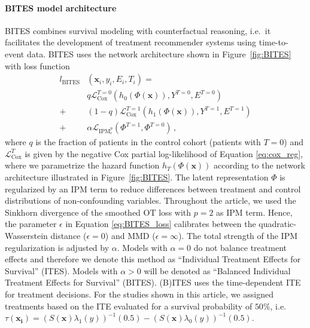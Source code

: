 \documentclass{article}
\newcommand{\myvec}[1]{\boldsymbol{#1}}
\begin{document}
	\paragraph{BITES model architecture} BITES combines survival modeling with counterfactual reasoning, i.e.~it facilitates the development of treatment recommender systems using time-to-event data. 
	BITES uses the network architecture shown in Figure~\ref{fig:BITES} with loss function
	\begin{align}
	l_{\text{BITES}}&(\myvec{x}_i,y_i,E_i,T_i)=\nonumber\\
	&q\mathcal{L}_{\text{Cox}}^{T=0}(h_0(\Phi(\textbf{x})),Y^{T=0},E^{T=0})\nonumber\\
	+&(1-q)\mathcal{L}_{\text{Cox}}^{T=1}(h_1(\Phi(\textbf{x})),Y^{T=1},E^{T=1})\nonumber\\
	+&\alpha \mathcal{L}_{\text{IPM}_\epsilon^p}(\Phi^{T=1},\Phi^{T=0})\label{eq:BITES_loss}\,,
	\end{align}
	where $q$ is the fraction of patients in the control cohort (patients with $T=0$) and $\mathcal{L}_{\text{Cox}}^{T}$ is given by the negative Cox partial log-likelihood of Equation \ref{eq:cox_reg}, where we parametrize the hazard function $h_T(\Phi(\textbf{x}))$ according to the network architecture illustrated in Figure~\ref{fig:BITES}. The latent representation $\Phi$ is regularized by an IPM term to reduce differences between treatment and control distributions of non-confounding variables. Throughout the article, we used the Sinkhorn divergence of the smoothed OT loss with $p=2$ as IPM term. Hence, the parameter $\epsilon$ in Equation \ref{eq:BITES_loss} calibrates between the quadratic-Wasserstein distance ($\epsilon = 0$) and MMD ($\epsilon = \infty$). The total strength of the IPM regularization is adjusted by $\alpha$. Models with $\alpha=0$ do not balance treatment effects and therefore we denote this method as ``Individual Treatment Effects for Survival'' (ITES). Models with $\alpha>0$ will be denoted as ``Balanced Individual Treatment Effects for Survival'' (BITES). (B)ITES uses the time-dependent ITE for treatment decisions. For the studies shown in this article, we assigned treatments based on the ITE evaluated for a survival probability of $50\%$, i.e.~$\tau(\myvec{x_i})=(S(\myvec{x})\lambda_1(y))^{-1}(0.5)-(S(\myvec{x})\lambda_0(y))^{-1}(0.5)$.
	
\end{document}
